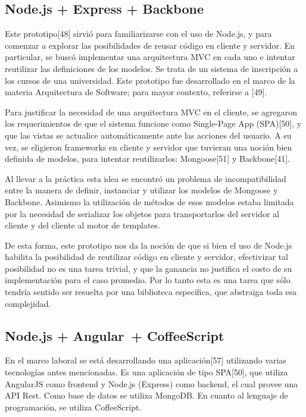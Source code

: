 \documentclass[doc,helv,longtable]{article}
\begin{document}
\subsection{Node.js + Express + Backbone}
Este prototipo[48] sirvió para familiarizarse con el uso de Node.js, y para comenzar a explorar las posibilidades de reusar código en cliente y servidor. En particular, se buscó implementar una arquitectura MVC en cada uno e intentar reutilizar las definiciones de los modelos. Se trata de un sistema de inscripción a los cursos de una universidad. Este prototipo fue desarrollado en el marco de la materia Arquitectura de Software; para mayor contexto, referirse a [49].

Para justificar la necesidad de una arquitectura MVC en el cliente, se agregaron los requerimientos de que el sistema funcione como Single-Page App (SPA)[50], y que las vistas se actualice automáticamente ante las acciones del usuario. A su vez, se eligieron frameworks en cliente y servidor que tuvieran una noción bien definida de modelos, para intentar reutilizarlos: Mongoose[51] y Backbone[41].

Al llevar a la práctica esta idea se encontró un problema de incompatibilidad entre la manera de definir, instanciar y utilizar los modelos de Mongoose y Backbone. Asimismo la utilización de métodos de esos modelos estaba limitada por la necesidad de serializar los objetos para transportarlos del servidor al cliente y del cliente al motor de templates.

De esta forma, este prototipo nos da la noción de que si bien el uso de Node.js habilita la posibilidad de reutilizar código en cliente y servidor, efectivizar tal posibilidad no es una tarea trivial, y que la ganancia no justifica el costo de su implementación para el caso promedio. Por lo tanto esta es una tarea que sólo tendría sentido ser resuelta por una biblioteca específica, que abstraiga toda esa complejidad.

\subsection{Node.js + Angular + CoffeeScript}
En el marco laboral se está desarrollando una aplicación[57] utilizando varias tecnologías antes mencionadas. Es una aplicación de tipo SPA[50], que utiliza AngularJS como frontend y Node.js (Express) como backend, el cual provee una API Rest. Como base de datos se utiliza MongoDB. En cuanto al lenguaje de programación, se utiliza CoffeeScript. 
\end{document}

